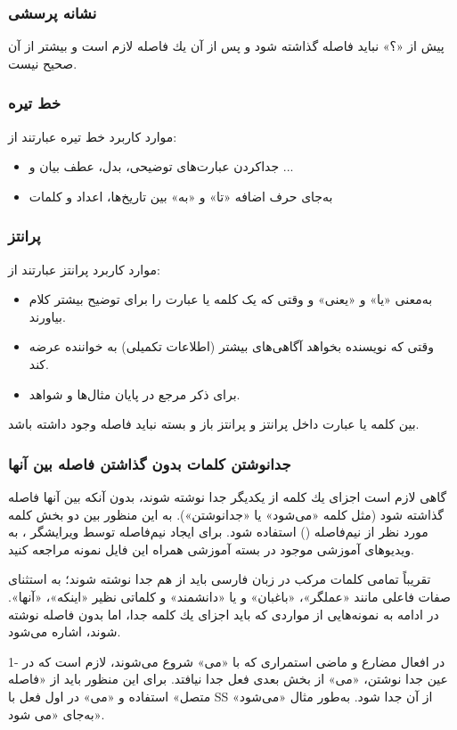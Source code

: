 \subsubsection{نشانه پرسشی}
پیش از «؟» نباید فاصله گذاشته شود و پس از آن یك فاصله لازم است و بیشتر از آن صحیح نیست. 
\subsubsection{خط تیره}
موارد كاربرد خط تیره عبارتند از:
\begin{itemize}
	\item 
جدا‌كردن عبارت‌های توضیحی، بدل، عطف بیان و ...
	\item 
به‌جای حرف اضافه «تا» و «به» بین تاریخ‌ها، اعداد و كلمات
\end{itemize}
\subsubsection{پرانتز }
موارد كاربرد پرانتز عبارتند از:
\begin{itemize}
\item 
به‌معنی «یا» و «یعنی» و وقتی كه یک كلمه یا عبارت را برای توضیح بیشتر كلام بیاورند.	
\item
وقتی كه نویسنده بخواهد آگاهی‌های بیشتر (اطلاعات تكمیلی) به خواننده عرضه كند.		
\item
		برای ذكر مرجع در پایان مثال‌ها و شواهد.	
\end{itemize}	
\begin{example}
	بین کلمه یا عبارت داخل پرانتز و پرانتز باز و بسته نباید فاصله وجود داشته باشد.
\end{example}

\subsubsection{جدانوشتن كلمات بدون گذاشتن فاصله بین آنها}
گاهی لازم است اجزای یك كلمه از یكدیگر جدا نوشته شوند، بدون آنكه بین آنها فاصله گذاشته شود (مثل كلمه «می‌شود» یا «جدانوشتن»). به این منظور بین دو بخش كلمه مورد نظر از نیم‌فاصله
()
 استفاده شود. برای ایجاد نیم‌فاصله توسط ویرایشگر 
،
 به ویدیوهای آموزشی موجود در بسته آموزشی همراه این فایل نمونه مراجعه کنید.
 
تقریباً تمامی كلمات مركب در زبان فارسی باید از هم جدا نوشته شوند؛ به استثنای صفات فاعلی مانند «عملگر»، «باغبان» و یا «دانشمند» و كلماتی نظیر «اینكه»، «آنها». در ادامه به نمونه‌هایی از مواردی كه باید اجزای یك كلمه جدا، اما بدون فاصله نوشته شوند، اشاره می‌شود‌.

1-	در افعال مضارع و ماضی استمراری كه با «می» شروع می‌شوند، لازم است كه در عین جدا نوشتن، «می» از بخش بعدی فعل جدا نیافتد‌.‌ برای این منظور باید از «فاصله متصل» استفاده و «می» در اول فعل با SS از آن جدا شود.‌ به‌طور مثال «می‌شود» به‌جای «می شود». 

